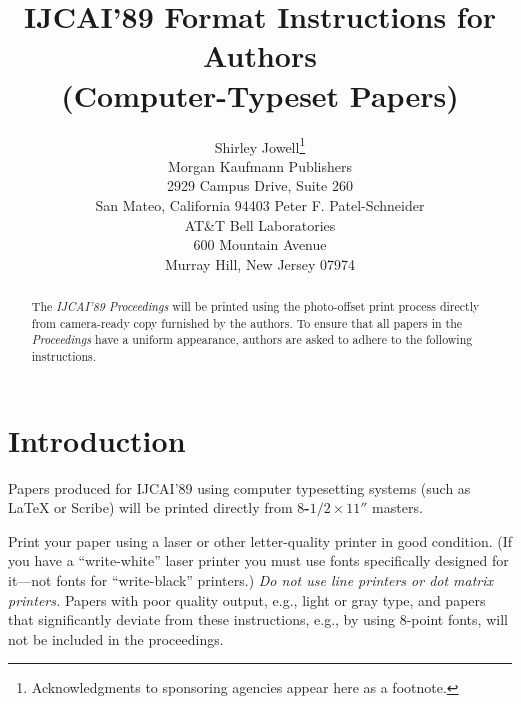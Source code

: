 
\title{IJCAI'89 Format Instructions for Authors \\ (Computer-Typeset Papers)}
\author{Shirley Jowell\thanks{Acknowledgments to sponsoring agencies
		appear here as a footnote.}\\ 
	Morgan Kaufmann Publishers \\
	2929 Campus Drive, Suite 260 \\
	San Mateo, California \hspace{1em} 94403
	\And
	Peter F. Patel-Schneider \\
	AT\&T Bell Laboratories \\
	600 Mountain Avenue \\
	Murray Hill, New Jersey \hspace{1em} 07974
	}

\newcommand{\usa}[2]{#1}



\maketitle

\begin{abstract}
The {\it IJCAI'89 Proceedings} will be printed using the photo-offset print
process directly from camera-ready copy furnished by the authors.  To
ensure that all papers in the {\it Proceedings} have a uniform appearance,
authors are asked to adhere to the following instructions.  
\end{abstract}

\section{Introduction}

Papers produced for IJCAI'89 using computer typesetting systems (such as
\LaTeX{} or Scribe) will be printed directly from {\bf $8$-$1/2 \times
11''$} masters.

Print your paper using a laser or other letter-quality printer in good
condition.  (If you have a ``write-white'' laser printer you must use fonts
specifically designed for it---not fonts for ``write-black'' printers.)
{\em Do not use line printers or dot matrix printers.} Papers with poor
quality output, e.g., light or gray type, and papers that significantly
deviate from these instructions, e.g., by using 8-point fonts, will not be
included in the proceedings.

